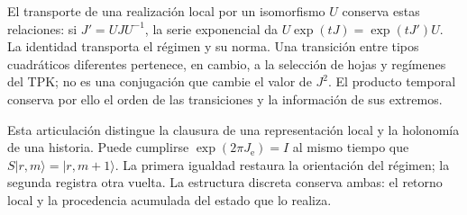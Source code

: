 El transporte de una realización local por un isomorfismo \(U\) conserva
estas relaciones: si \(J'=UJU^{-1}\), la serie exponencial da
\(U\exp(tJ)=\exp(tJ')U\). La identidad transporta el régimen y su
norma. Una transición entre tipos cuadráticos diferentes pertenece, en
cambio, a la selección de hojas y regímenes del TPK; no es una conjugación
que cambie el valor de \(J^2\). El producto temporal conserva por ello el
orden de las transiciones y la información de sus extremos.

Esta articulación distingue la clausura de una representación local y la
holonomía de una historia. Puede cumplirse \(\exp(2\pi J_{\mathrm e})=I\)
al mismo tiempo que \(S|r,m\rangle=|r,m+1\rangle\). La primera igualdad
restaura la orientación del régimen; la segunda registra otra vuelta. La
estructura discreta conserva ambas: el retorno local y la procedencia
acumulada del estado que lo realiza.
